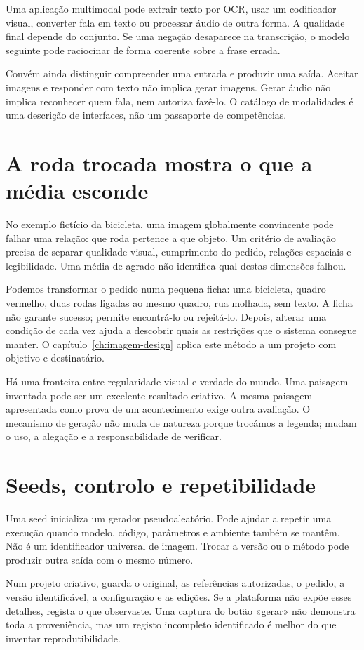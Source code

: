 Uma aplicação multimodal pode extrair texto por OCR, usar um codificador visual, converter fala em texto ou processar áudio de outra forma. A qualidade final depende do conjunto. Se uma negação desaparece na transcrição, o modelo seguinte pode raciocinar de forma coerente sobre a frase errada.

Convém ainda distinguir compreender uma entrada e produzir uma saída. Aceitar imagens e responder com texto não implica gerar imagens. Gerar áudio não implica reconhecer quem fala, nem autoriza fazê-lo. O catálogo de modalidades é uma descrição de interfaces, não um passaporte de competências.

\section{A roda trocada mostra o que a média esconde}
No exemplo fictício da bicicleta, uma imagem globalmente convincente pode falhar uma relação: que roda pertence a que objeto. Um critério de avaliação precisa de separar qualidade visual, cumprimento do pedido, relações espaciais e legibilidade. Uma média de agrado não identifica qual destas dimensões falhou.

Podemos transformar o pedido numa pequena ficha: uma bicicleta, quadro vermelho, duas rodas ligadas ao mesmo quadro, rua molhada, sem texto. A ficha não garante sucesso; permite encontrá-lo ou rejeitá-lo. Depois, alterar uma condição de cada vez ajuda a descobrir quais as restrições que o sistema consegue manter. O capítulo~\ref{ch:imagem-design} aplica este método a um projeto com objetivo e destinatário.

Há uma fronteira entre regularidade visual e verdade do mundo. Uma paisagem inventada pode ser um excelente resultado criativo. A mesma paisagem apresentada como prova de um acontecimento exige outra avaliação. O mecanismo de geração não muda de natureza porque trocámos a legenda; mudam o uso, a alegação e a responsabilidade de verificar.

\section{Seeds, controlo e repetibilidade}
Uma seed inicializa um gerador pseudoaleatório. Pode ajudar a repetir uma execução quando modelo, código, parâmetros e ambiente também se mantêm. Não é um identificador universal de imagem. Trocar a versão ou o método pode produzir outra saída com o mesmo número.

Num projeto criativo, guarda o original, as referências autorizadas, o pedido, a versão identificável, a configuração e as edições. Se a plataforma não expõe esses detalhes, regista o que observaste. Uma captura do botão «gerar» não demonstra toda a proveniência, mas um registo incompleto identificado é melhor do que inventar reprodutibilidade.

